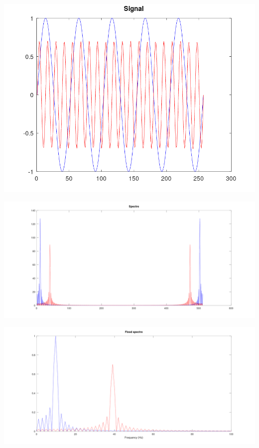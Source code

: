 \begin{enumerate}
        \begin{center}
            \centering
            \includegraphics[width=\textwidth]{../octave/spectre1/signal/spectre.png}
            \label{img:signal}
        \end{center}
        \begin{center}
            \centering
            \includegraphics[width=\textwidth]{../octave/spectre1/spectre/spectre.png}
            \label{img:spectre}
        \end{center}
        \begin{center}
            \centering
            \includegraphics[width=\textwidth]{../octave/spectre1/spectre/spectre_fix.png}
            \label{img:spectre-fix}
        \end{center}
\end{enumerate}

